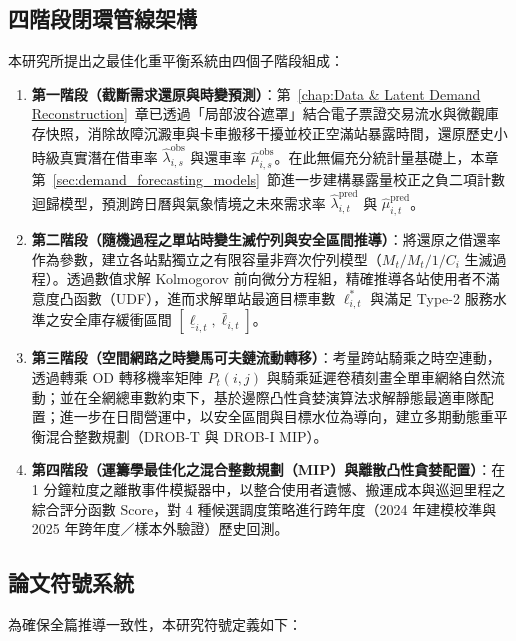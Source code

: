 \subsection{四階段閉環管線架構}

本研究所提出之最佳化重平衡系統由四個子階段組成：
\begin{enumerate}
    \item \textbf{第一階段（截斷需求還原與時變預測）}：第~\ref{chap:Data & Latent Demand Reconstruction}~章已透過「局部波谷遮罩」結合電子票證交易流水與微觀庫存快照，消除故障沉澱車與卡車搬移干擾並校正空滿站暴露時間，還原歷史小時級真實潛在借車率 $\hat{\lambda}^{\text{obs}}_{i,s}$ 與還車率 $\hat{\mu}^{\text{obs}}_{i,s}$。在此無偏充分統計量基礎上，本章第~\ref{sec:demand_forecasting_models}~節進一步建構暴露量校正之負二項計數迴歸模型，預測跨日曆與氣象情境之未來需求率 $\hat{\lambda}^{\text{pred}}_{i,t}$ 與 $\hat{\mu}^{\text{pred}}_{i,t}$。
    \item \textbf{第二階段（隨機過程之單站時變生滅佇列與安全區間推導）}：將還原之借還率作為參數，建立各站點獨立之有限容量非齊次佇列模型（$M_t/M_t/1/C_i$ 生滅過程）。透過數值求解 Kolmogorov 前向微分方程組，精確推導各站使用者不滿意度凸函數（UDF），進而求解單站最適目標車數 $\ell^*_{i,t}$ 與滿足 Type-2 服務水準之安全庫存緩衝區間 $[\underline{\ell}_{i,t}, \bar{\ell}_{i,t}]$。
    \item \textbf{第三階段（空間網路之時變馬可夫鏈流動轉移）}：考量跨站騎乘之時空連動，透過轉乘 OD 轉移機率矩陣 $P_t(i,j)$ 與騎乘延遲卷積刻畫全單車網絡自然流動；並在全網總車數約束下，基於邊際凸性貪婪演算法求解靜態最適車隊配置；進一步在日間營運中，以安全區間與目標水位為導向，建立多期動態重平衡混合整數規劃（DROB-T 與 DROB-I MIP）。
    \item \textbf{第四階段（運籌學最佳化之混合整數規劃（MIP）與離散凸性貪婪配置）}：在 1 分鐘粒度之離散事件模擬器中，以整合使用者遺憾、搬運成本與巡迴里程之綜合評分函數 $\text{Score}$，對 4 種候選調度策略進行跨年度（2024 年建模校準與 2025 年跨年度／樣本外驗證）歷史回測。
\end{enumerate}

\subsection{論文符號系統}

為確保全篇推導一致性，本研究符號定義如下：

